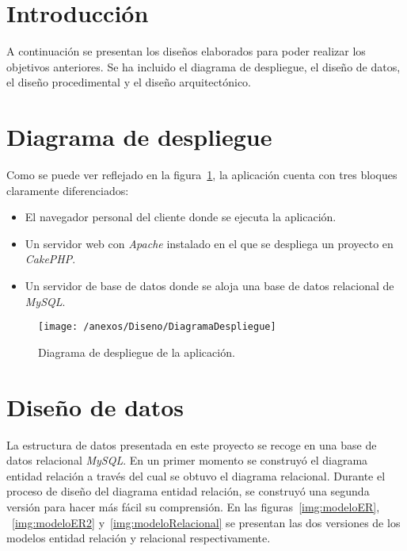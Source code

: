 
\section{Introducción}

A continuación se presentan los diseños elaborados para poder realizar los objetivos anteriores. Se ha incluido el diagrama de despliegue, el diseño de datos, el diseño procedimental y el diseño arquitectónico.

\section{Diagrama de despliegue}

Como se puede ver reflejado en la figura~\ref{img:diagramaDespliegue}, la aplicación cuenta con tres bloques claramente diferenciados:

\begin{itemize}
	\item El navegador personal del cliente donde se ejecuta la aplicación. 
	\item Un servidor web con \textit{Apache} instalado en el que se despliega un proyecto en \textit{CakePHP}.
	\item Un servidor de base de datos donde se aloja una base de datos relacional de \textit{MySQL}.
\end{itemize}

\begin{figure}[h]
	\centering
	\texttt{[image: /anexos/Diseno/DiagramaDespliegue]}
	\caption{Diagrama de despliegue de la aplicación.}
	\label{img:diagramaDespliegue}
\end{figure}

\section{Diseño de datos}

La estructura de datos presentada en este proyecto se recoge en una base de datos relacional \textit{MySQL}. En un primer momento se construyó el diagrama entidad relación a través del cual se obtuvo el diagrama relacional. Durante el proceso de diseño del diagrama entidad relación, se construyó una segunda versión para hacer más fácil su comprensión. En las figuras~\ref{img:modeloER}, ~\ref{img:modeloER2} y~\ref{img:modeloRelacional} se presentan las dos versiones de los modelos entidad relación y relacional respectivamente.

